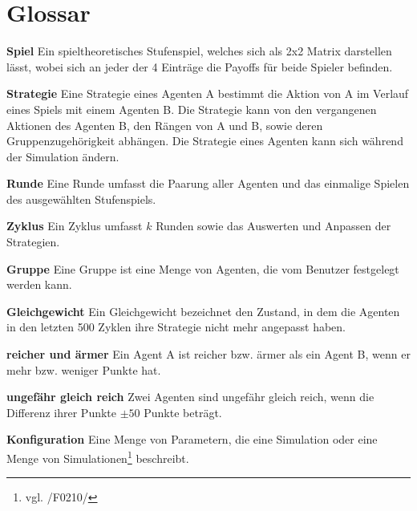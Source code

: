 \section{Glossar}

\textbf{Spiel}
Ein spieltheoretisches Stufenspiel, welches sich als 2x2 Matrix darstellen lässt, wobei sich an jeder der 4 Einträge die Payoffs für beide Spieler befinden.

\textbf{Strategie}
Eine Strategie eines Agenten A bestimmt die Aktion von A im Verlauf eines Spiels mit einem Agenten B. Die Strategie kann von den vergangenen Aktionen des Agenten B, den Rängen von A und B, sowie deren Gruppenzugehörigkeit abhängen. Die Strategie eines Agenten kann sich während der Simulation ändern.

\textbf{Runde}
Eine Runde umfasst die Paarung aller Agenten und das einmalige Spielen des ausgewählten Stufenspiels.

\textbf{Zyklus}
Ein Zyklus umfasst $k$ Runden sowie das Auswerten und Anpassen der Strategien.

\textbf{Gruppe}
Eine Gruppe ist eine Menge von Agenten, die vom Benutzer festgelegt werden kann.

\textbf{Gleichgewicht}
Ein Gleichgewicht bezeichnet den Zustand, in dem die Agenten in den letzten 500 Zyklen ihre Strategie nicht mehr angepasst haben.

\textbf{reicher und ärmer}
Ein Agent A ist reicher bzw. ärmer als ein Agent B, wenn er mehr bzw. weniger Punkte hat.

\textbf{ungefähr gleich reich}
Zwei Agenten sind ungefähr gleich reich, wenn die Differenz ihrer Punkte $\pm 50$ Punkte beträgt.

\textbf{Konfiguration}
Eine Menge von Parametern, die eine Simulation oder eine Menge von Simulationen\footnote{vgl. /F0210/} beschreibt.
